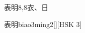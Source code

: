 \begin{entry}{表明}{8,8}{⾐、⽇}
  \begin{phonetics}{表明}{biao3ming2}[][HSK 3]
  \end{phonetics}
\end{entry}
